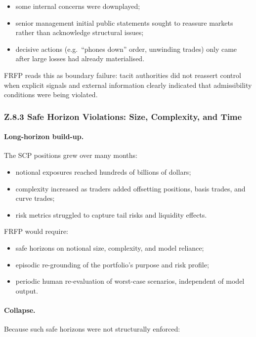 \begin{itemize}
  \item some internal concerns were downplayed;
  \item senior management initial public statements sought to reassure
        markets rather than acknowledge structural issues;
  \item decisive actions (e.g.\ ``phones down'' order, unwinding trades)
        only came after large losses had already materialised.
\end{itemize}

FRFP reads this as boundary failure:
tacit authorities did not reassert control when explicit signals and external
information clearly indicated that admissibility conditions were being
violated.

\subsubsection*{Z.8.3 Safe Horizon Violations:
  Size, Complexity, and Time}

\paragraph{Long-horizon build-up.}
The SCP positions grew over many months:

\begin{itemize}
  \item notional exposures reached hundreds of billions of dollars;
  \item complexity increased as traders added offsetting positions, basis
        trades, and curve trades;
  \item risk metrics struggled to capture tail risks and liquidity effects.
\end{itemize}

FRFP would require:

\begin{itemize}
  \item safe horizons on notional size, complexity, and model reliance;
  \item episodic re-grounding of the portfolio’s purpose and risk profile;
  \item periodic human re-evaluation of worst-case scenarios, independent of
        model output.
\end{itemize}

\paragraph{Collapse.}
Because such safe horizons were not structurally enforced:

